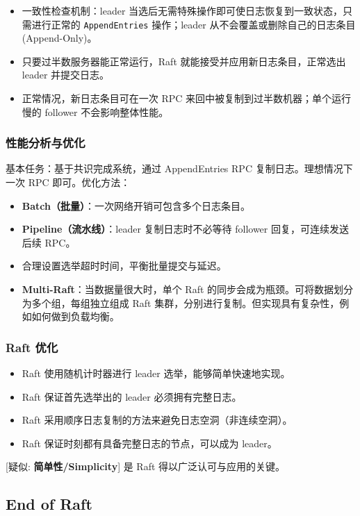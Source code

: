 \begin{itemize}
\item 一致性检查机制：leader 当选后无需特殊操作即可使日志恢复到一致状态，只需进行正常的 \texttt{AppendEntries} 操作；leader 从不会覆盖或删除自己的日志条目 (Append-Only)。
\item 只要过半数服务器能正常运行，Raft 就能接受并应用新日志条目，正常选出 leader 并提交日志。
\item 正常情况，新日志条目可在一次 RPC 来回中被复制到过半数机器；单个运行慢的 follower 不会影响整体性能。
\end{itemize}

\subsubsection{性能分析与优化}

基本任务：基于共识完成系统，通过 AppendEntries RPC 复制日志。理想情况下一次 RPC 即可。优化方法：
\begin{itemize}
\item \textbf{Batch（批量）}：一次网络开销可包含多个日志条目。
\item \textbf{Pipeline（流水线）}：leader 复制日志时不必等待 follower 回复，可连续发送后续 RPC。
\item 合理设置选举超时时间，平衡批量提交与延迟。
\item \textbf{Multi-Raft}：当数据量很大时，单个 Raft 的同步会成为瓶颈。可将数据划分为多个组，每组独立组成 Raft 集群，分别进行复制。但实现具有复杂性，例如如何做到负载均衡。
\end{itemize}

\subsubsection{Raft 优化}

\begin{itemize}
\item Raft 使用随机计时器进行 leader 选举，能够简单快速地实现。
\item Raft 保证首先选举出的 leader 必须拥有完整日志。
\item Raft 采用顺序日志复制的方法来避免日志空洞（非连续空洞）。
\item Raft 保证时刻都有具备完整日志的节点，可以成为 leader。
\end{itemize}

[疑似: \textbf{简单性/Simplicity}] 是 Raft 得以广泛认可与应用的关键。


\subsection{End of Raft}
